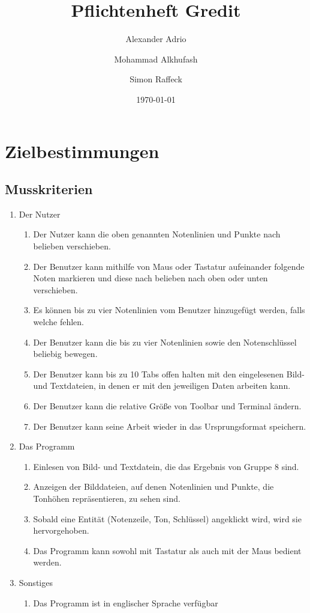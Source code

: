 \documentclass[10pt, paper = a4, oneside,final]{article}
\title{\Huge Pflichtenheft Gredit}
\date{\Large\today}
\author{Alexander Adrio \and
		Mohammad Alkhufash \and
		Simon Raffeck}
\begin{document}
\maketitle
\tableofcontents
\pagebreak

\section{Zielbestimmungen}
\subsection{Musskriterien}
\begin{enumerate}[label=$\circ$]
	\item Der Nutzer \begin{enumerate}[label=$\circ$]
		\item Der Nutzer kann die oben genannten Notenlinien und Punkte nach belieben verschieben.
		\item Der Benutzer kann mithilfe von Maus oder Tastatur aufeinander folgende Noten markieren und diese nach belieben nach oben oder unten verschieben.
		\item Es können bis zu vier Notenlinien vom Benutzer hinzugefügt werden, falls welche fehlen.
		\item Der Benutzer kann die bis zu vier Notenlinien sowie den Notenschlüssel beliebig bewegen.
		\item Der Benutzer kann bis zu 10 Tabs offen halten mit den eingelesenen Bild- und Textdateien, in denen er mit den jeweiligen Daten arbeiten kann.
		\item Der Benutzer kann die relative Größe von Toolbar und Terminal ändern.
		
		\item Der Benutzer kann seine Arbeit wieder in das Ursprungsformat speichern.
	\end{enumerate} 
	\item Das Programm \begin{enumerate}[label=$\circ$]
	\item Einlesen von Bild- und Textdatein, die das Ergebnis von Gruppe 8 sind.
	\item Anzeigen der Bilddateien, auf denen Notenlinien und Punkte, die Tonhöhen repräsentieren, zu sehen sind.
	\item Sobald eine Entität (Notenzeile, Ton, Schlüssel) angeklickt wird, wird sie hervorgehoben.
	\item Das Programm kann sowohl mit Tastatur als auch mit der Maus bedient werden.
	\end{enumerate}
	\item Sonstiges \begin{enumerate}[label=$\circ$]
	\item Das Programm ist in englischer Sprache verfügbar
	\end{enumerate}
	
\end{enumerate}
\end{document}
